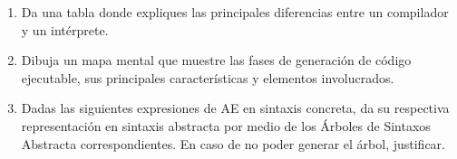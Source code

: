 \documentclass[letterpaper,11pt]{article}
\begin{document}
\begin{enumerate}
    \item Da una tabla donde expliques las principales diferencias entre un 
    compilador y un intérprete.

    \item Dibuja un mapa mental que muestre las fases de generación de código
    ejecutable, sus principales características y elementos involucrados.

    \item Dadas las siguientes expresiones de AE en sintaxis concreta, da su 
    respectiva representación en sintaxis abstracta por medio de los Árboles 
    de Sintaxos Abstracta correspondientes. En caso de no poder generar el
    árbol, justificar. 
\end{enumerate}
\end{document}
